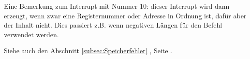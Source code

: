 Eine Bemerkung zum Interrupt mit Nummer 10: dieser Interrupt wird dann erzeugt,
wenn zwar eine Registernummer oder Adresse in Ordnung ist, dafür aber der Inhalt
nicht. Dies passiert z.B. wenn negativen Längen für den Befehl 
verwendet werden.


Siehe auch den Abschnitt \ref{subsec:Speicherfehler}
, Seite \pageref{subsec:Speicherfehler}.
